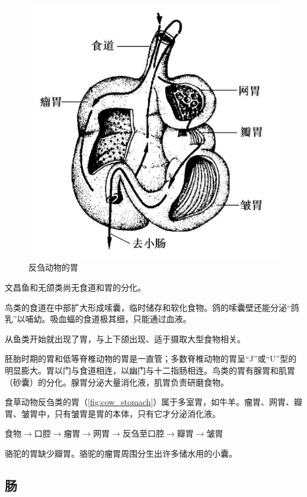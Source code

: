 \begin{figure}
	\centering
	\includegraphics[width=\linewidth]{Pics/反刍胃}
	\caption{反刍动物的胃}
	\label{fig:cow_stomach}
\end{figure}

文昌鱼和无颌类尚无食道和胃的分化。

鸟类的食道在中部扩大形成嗦囊，临时储存和软化食物。鸽的嗦囊壁还能分泌“鸽乳”以哺幼。吸血蝠的食道极其细，只能通过血液。

从鱼类开始就出现了胃，与上下颌出现、适于摄取大型食物相关。

胚胎时期的胃和低等脊椎动物的胃是一直管；多数脊椎动物的胃呈“J”或“U”型的明显膨大。胃以门与食道相连，以幽门与十二指肠相连。鸟类的胃有腺胃和肌胃（砂囊）的分化。腺胃分泌大量消化液，肌胃负责研磨食物。

食草动物反刍类的胃（\autoref{fig:cow_stomach}）属于多室胃，如牛羊。瘤胃、网胃、瓣胃、皱胃中，只有皱胃是胃的本体，只有它才分泌消化液。

食物$\longrightarrow$口腔$\longrightarrow$瘤胃$\longrightarrow$网胃$\longrightarrow$反刍至口腔$\longrightarrow$瓣胃$\longrightarrow$皱胃

骆驼的胃缺少瓣胃。骆驼的瘤胃周围分生出许多储水用的小囊。

\subsection{肠}

